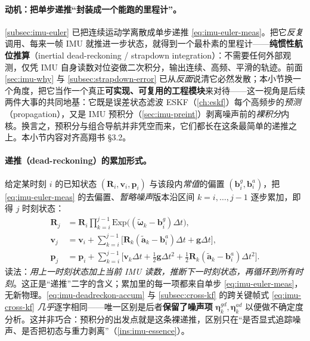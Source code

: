 \paragraph{动机：把单步递推“封装成一个能跑的里程计”。}
\cref{subsec:imu-euler} 已把连续运动学离散成单步递推 \cref{eq:imu-euler-meas}。把它\emph{反复}调用、每来一帧 IMU 就推进一步状态，就得到一个最朴素的里程计——\textbf{纯惯性航位推算}（inertial dead-reckoning / strapdown integration）：不需要任何外部观测，仅凭 IMU 自身读数对位姿做二次积分，输出连续、高频、平滑的轨迹。前面 \cref{sec:imu-why} 与 \cref{subsec:strapdown-error} 已从\emph{反面}说清它必然发散；本小节换一个角度，把它当作一个真正\textbf{可实现、可复用的工程模块}来对待——这一视角是后续两件大事的共同地基：它既是误差状态滤波 ESKF（\cref{ch:eskf}）每个高频步的\emph{预测}（propagation），又是 IMU 预积分（\cref{sec:imu-preint}）剥离噪声前的\emph{裸积分}内核\cite{gao2023slamad}。换言之，预积分与组合导航并非凭空而来，它们都长在这条最简单的递推之上。本小节内容对齐高翔书 §3.2。

\paragraph{递推（dead-reckoning）的累加形式。}
给定某时刻 $i$ 的已知状态 $(\mathbf R_i,\mathbf v_i,\mathbf p_i)$ 与该段内\emph{常值}的偏置 $(\mathbf b_i^g,\mathbf b_i^a)$，把 \cref{eq:imu-euler-meas} 的去偏置、\emph{暂略噪声}版本沿区间 $k=i,\dots,j-1$ 逐步累加，即得 $j$ 时刻状态\cite{gao2023slamad}：
\begin{equation}
\boxed{\;
\begin{aligned}
  \mathbf R_j&=\mathbf R_i\prod_{k=i}^{j-1}\mathrm{Exp}\!\big((\tilde{\boldsymbol\omega}_k-\mathbf b_i^g)\Delta t\big),\\
  \mathbf v_j&=\mathbf v_i+\sum_{k=i}^{j-1}\Big[\mathbf R_k(\tilde{\mathbf a}_k-\mathbf b_i^a)\Delta t+\mathbf g\Delta t\Big],\\
  \mathbf p_j&=\mathbf p_i+\sum_{k=i}^{j-1}\Big[\mathbf v_k\Delta t+\tfrac12\mathbf g\Delta t^2+\tfrac12\mathbf R_k(\tilde{\mathbf a}_k-\mathbf b_i^a)\Delta t^2\Big].
\end{aligned}
\;}
  \label{eq:imu-deadreckon-accum}
\end{equation}
读法：\emph{用上一时刻状态加上当前 IMU 读数，推断下一时刻状态，再循环到所有时刻}。这正是“递推”二字的含义；累加里的每一项都来自单步 \cref{eq:imu-euler-meas}，无新物理。\cref{eq:imu-deadreckon-accum} 与 \cref{subsec:cross-kf} 的跨关键帧式 \cref{eq:imu-cross-kf} \emph{几乎}逐字相同——唯一区别是后者\textbf{保留了噪声项} $\boldsymbol\eta_k^{gd},\boldsymbol\eta_k^{ad}$ 以便做不确定度分析。这并非巧合：预积分的出发点就是这条裸递推，区别只在“是否显式追踪噪声、是否把初态与重力剥离”（\cref{ins:imu-essence}）。

